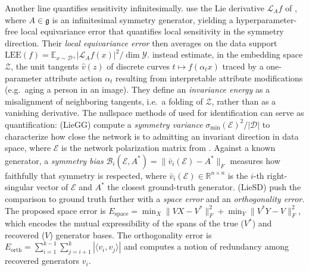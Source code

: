 \documentclass[mathematics,review,submit,moreauthors]{Definitions/mdpi}
\begin{document}
Another line quantifies sensitivity infinitesimally.
\citet{gruver2024} use the Lie derivative $\mathcal{L}_A f$ of , where $A\in\mathfrak{g}$ is an infinitesimal symmetry generator, yielding a hyperparameter-free local equivariance error that quantifies local sensitivity in the symmetry direction.
Their \emph{local equivariance error} then averages on the data support $\mathrm{LEE}(f)=\mathbb E_{x\sim\mathcal D},|\mathcal L_Af(x)|^2/\dim\mathcal Y$.
\citet{leroy2025} instead estimate, in the embedding space $\mathcal{Z}$, the unit tangents $\hat v(z)$ of discrete curves $t\mapsto f(\alpha_t x)$ traced by a one-parameter attribute action $\alpha_t$ resulting from interpretable attribute modifications (e.g.\ aging a person in an image).
They define an \emph{invariance energy} as a misalignment of neighboring tangents, i.e.\ a folding of $\mathcal{Z}$, rather than as a vanishing derivative.
The nullspace methods of  used for identification can serve as quantification: \citet{moskalev2023} (LieGG) compute a \emph{symmetry variance} $\sigma_{\min}(\mathcal{E})^2/|\mathcal{D}|$ to characterize how close the network is to admitting an invariant direction in data space, where $\mathcal{E}$ is the network polarization matrix from .
Against a known generator, a \emph{symmetry bias} $\mathcal{B}_i(\mathcal{E},A^*) = \lVert \bar v_i(\mathcal{E}) - A^*\rVert_F$ measures how faithfully that symmetry is respected, where $\bar v_i(\mathcal{E})\in\mathbb{R}^{n\times n}$ is the $i$-th right-singular vector of $\mathcal{E}$ and $A^*$ the closest ground-truth generator.
\citet{hu2025nn} (LieSD) push the comparison to ground truth further with a \emph{space error} and an \emph{orthogonality error}.
The proposed space error is $E_{\mathrm{space}} = \min_{X} \|VX - V^*\|_F^2 + \min_{Y} \|V^*Y - V\|_F^2$, which encodes the mutual expressibility of the spans of the true ($V^*$) and recovered ($V$) generator bases.
The orthogonality error is $E_{\mathrm{orth}} = \sum_{i=1}^{k-1} \sum_{j=i+1}^{k} |\langle v_i, v_j \rangle|$ and computes a notion of redundancy among recovered generators $v_i$.
\end{document}
